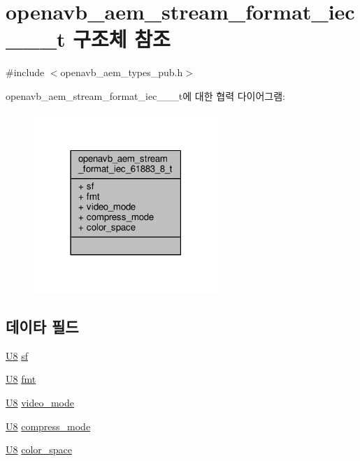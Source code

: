 \hypertarget{structopenavb__aem__stream__format__iec__61883__8__t}{}\section{openavb\+\_\+aem\+\_\+stream\+\_\+format\+\_\+iec\+\_\+\_\+\_\+t 구조체 참조}
\label{structopenavb__aem__stream__format__iec__61883__8__t}


{\ttfamily \#include $<$openavb\+\_\+aem\+\_\+types\+\_\+pub.\+h$>$}



openavb\+\_\+aem\+\_\+stream\+\_\+format\+\_\+iec\+\_\+\_\+\_\+t에 대한 협력 다이어그램\+:
\nopagebreak
\begin{figure}[H]
\begin{center}
\leavevmode
\includegraphics[width=198pt]{structopenavb__aem__stream__format__iec__61883__8__t__coll__graph}
\end{center}
\end{figure}
\subsection*{데이타 필드}
\begin{DoxyCompactItemize}
\item 
\hyperlink{openavb__types__base__pub_8h_aa63ef7b996d5487ce35a5a66601f3e73}{U8} \hyperlink{structopenavb__aem__stream__format__iec__61883__8__t_a153db177c2b7653917dff143e5f755e1}{sf}
\item 
\hyperlink{openavb__types__base__pub_8h_aa63ef7b996d5487ce35a5a66601f3e73}{U8} \hyperlink{structopenavb__aem__stream__format__iec__61883__8__t_ab88030d1822b822615cede2168f1c31e}{fmt}
\item 
\hyperlink{openavb__types__base__pub_8h_aa63ef7b996d5487ce35a5a66601f3e73}{U8} \hyperlink{structopenavb__aem__stream__format__iec__61883__8__t_a0668258a00d1fdc63063142073b348f0}{video\+\_\+mode}
\item 
\hyperlink{openavb__types__base__pub_8h_aa63ef7b996d5487ce35a5a66601f3e73}{U8} \hyperlink{structopenavb__aem__stream__format__iec__61883__8__t_ab1fc312ec72ce114eef1cbf5bca02471}{compress\+\_\+mode}
\item 
\hyperlink{openavb__types__base__pub_8h_aa63ef7b996d5487ce35a5a66601f3e73}{U8} \hyperlink{structopenavb__aem__stream__format__iec__61883__8__t_acb8674082f5dedfb3979a0883ba8baae}{color\+\_\+space}
\end{DoxyCompactItemize}


